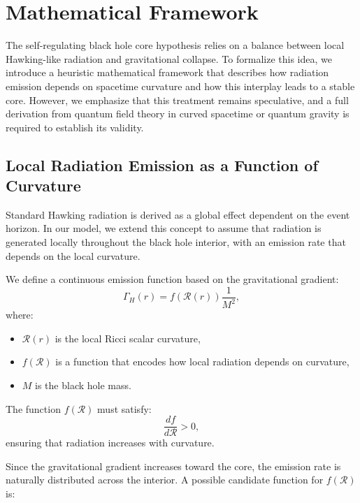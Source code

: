 \section{Mathematical Framework}
\label{sec:math_framework}

The self-regulating black hole core hypothesis relies on a balance between local Hawking-like radiation and gravitational collapse. To formalize this idea, we introduce a heuristic mathematical framework that describes how radiation emission depends on spacetime curvature and how this interplay leads to a stable core. However, we emphasize that this treatment remains speculative, and a full derivation from quantum field theory in curved spacetime or quantum gravity is required to establish its validity.

\subsection{Local Radiation Emission as a Function of Curvature}

Standard Hawking radiation is derived as a global effect dependent on the event horizon. In our model, we extend this concept to assume that radiation is generated locally throughout the black hole interior, with an emission rate that depends on the local curvature.

We define a continuous emission function based on the gravitational gradient:
\begin{equation}
    \Gamma_H(r) = f(\mathcal{R}(r)) \frac{1}{M^2},
\end{equation}
where:
\begin{itemize}
    \item \( \mathcal{R}(r) \) is the local Ricci scalar curvature,
    \item \( f(\mathcal{R}) \) is a function that encodes how local radiation depends on curvature,
    \item \( M \) is the black hole mass.
\end{itemize}

The function \( f(\mathcal{R}) \) must satisfy:
\begin{equation}
    \frac{df}{d\mathcal{R}} > 0,
\end{equation}
ensuring that radiation increases with curvature.

Since the gravitational gradient increases toward the core, the emission rate is naturally distributed across the interior. A possible candidate function for \( f(\mathcal{R}) \) is:

